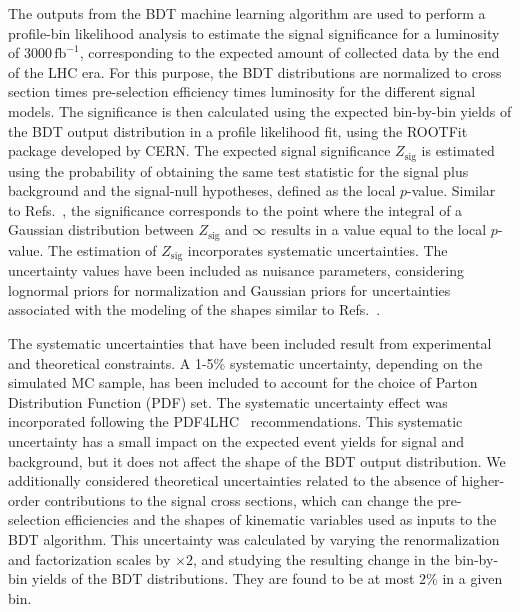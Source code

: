 The outputs from the BDT machine learning algorithm are used to perform a profile-bin likelihood analysis to estimate the signal significance for a luminosity of $3000\,\mathrm{fb^{-1}}$, corresponding to the expected amount of collected data by the end of the LHC era. For this purpose, the BDT distributions are normalized to cross section times pre-selection efficiency times luminosity for the different signal models. The significance is then calculated using the expected bin-by-bin yields of the BDT output distribution in a profile likelihood fit, using the ROOTFit~\parencite{Butterworth:2015oua} package developed by CERN. The expected signal significance $Z_\text{sig}$ is estimated using the probability of obtaining the same test statistic for the  signal plus background and the signal-null hypotheses, defined as the local $p$-value. Similar to Refs.~\parencite{Florez:2021zoo, Florez:2019tqr, Florez:2018ojp, Florez:2017xhf, VBFZprimePaper, Florez:2016lwi, Leonardi_2020}, the significance  corresponds to the point where the integral of a Gaussian distribution between $Z_\text{sig}$ and $\infty$ results in a value equal to the local $p$-value. The estimation of $Z_\text{sig}$ incorporates  systematic uncertainties. The uncertainty values have been included as nuisance parameters, considering lognormal priors for normalization and Gaussian priors for uncertainties associated with the modeling of the shapes similar to Refs.~\parencite{natalia2021longtermlhcdiscoveryreach, PhysRevD.103.095001}. 

The systematic uncertainties that have been included result from experimental and theoretical constraints.   A 1-5\% systematic uncertainty, depending on the simulated MC sample, has been included to account for the choice of Parton Distribution Function (PDF) set. The systematic uncertainty effect was incorporated following the PDF4LHC~\parencite{Butterworth:2015oua} recommendations. This systematic uncertainty has a small impact on the expected event yields for signal and background, but it does not affect the shape of the BDT output distribution. We additionally considered theoretical uncertainties related to the absence of higher-order contributions to the signal cross sections, which can change the pre-selection efficiencies and the shapes of kinematic variables used as inputs to the BDT algorithm. This uncertainty was calculated by varying the renormalization and factorization scales by $\times 2$, and studying the resulting change in the bin-by-bin yields of the BDT distributions. They are found to be at most $2$\% in a given bin. 

